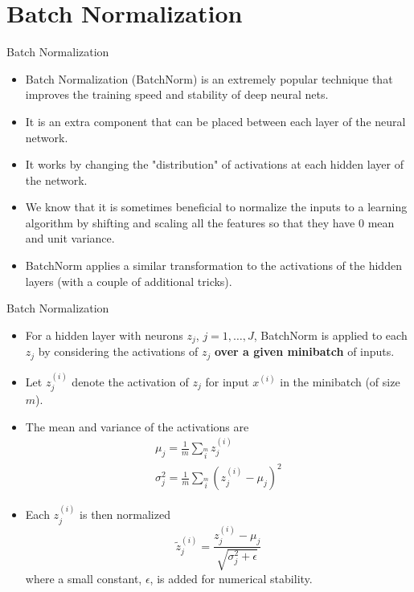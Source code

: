 \documentclass[11pt,compress,t,notes=noshow, xcolor=table]{beamer}
\begin{document}
\section{Batch Normalization}

\begin{frame} {Batch Normalization}
  \begin{itemize}
    \item Batch Normalization (BatchNorm) is an extremely popular technique that improves the training speed and stability of deep neural nets.
    \item It is an extra component that can be placed between each layer of the neural network.
    \item It works by changing the "distribution" of activations at each hidden layer of the network.
    \item We know that it is sometimes beneficial to normalize the inputs to a learning algorithm by shifting and scaling all the features so that they have 0 mean and unit variance.
    \item%
     BatchNorm applies a similar transformation to the activations of the hidden layers (with a couple of additional tricks).
  \end{itemize}
\end{frame}

\begin{frame} {Batch Normalization}
  \begin{itemize}
    \item For a hidden layer with neurons $z_j$, $j=1, \dots, J$, BatchNorm is applied to each $z_j$ by considering the activations of $z_j$ \textbf{over a given minibatch} of inputs.
    \item Let $z_j^{(i)}$ denote the activation of $z_j$ for input $x^{(i)}$ in the minibatch (of size $m$).
    \item The mean and variance of the activations are
      \begin{equation*}
          \begin{array}{l}
            \mu_j = \frac{1}{m} \sum \limits_i \limits^m z_j^{(i)} \\
            \sigma^2_j = \frac{1}{m} \sum \limits_i \limits^m (z_j^{(i)} - \mu_j)^2
          \end{array}
      \end{equation*}
    \item Each $z_j^{(i)}$ is then normalized 
        \begin{equation*}
          \tilde z_j^{(i)} = \frac {z_j^{(i)} - \mu_j}{\sqrt{\sigma^2_j + \epsilon}}
        \end{equation*}
        where a small constant, $\epsilon$, is added for numerical stability.
  \end{itemize}
\end{frame}
\end{document}
